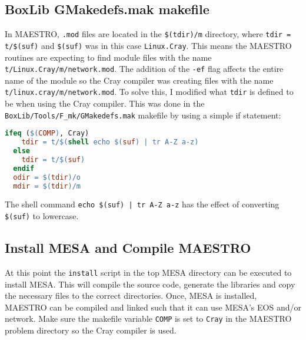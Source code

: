 \subsection{{\sf BoxLib GMakedefs.mak} makefile}

In {\sf MAESTRO}, {\tt .mod} files are located in the {\tt \$(tdir)/m} 
directory, where {\tt tdir = t/\$(suf)} and {\tt \$(suf)} was in this case 
{\tt Linux.Cray}. This means the {\sf MAESTRO} routines are expecting to find 
module files with the name {\tt t/Linux.Cray/m/network.mod}. The addition of 
the {\tt -ef} flag affects the entire name of the module so the Cray compiler 
was creating files with the name {\tt t/linux.cray/m/network.mod}. To solve 
this, I modified what {\tt tdir} is defined to be when using the Cray compiler. 
This was done in the {\tt BoxLib/Tools/F\_mk/GMakedefs.mak} makefile by using 
a simple if statement:
\begin{lstlisting}[language=make,mathescape=false]
  ifeq ($(COMP), Cray)
    tdir = t/$(shell echo $(suf) | tr A-Z a-z)
  else
    tdir = t/$(suf)
  endif
  odir = $(tdir)/o
  mdir = $(tdir)/m
\end{lstlisting}
The shell command {\tt echo \$(suf) | tr A-Z a-z} has the effect of converting 
{\tt \$(suf)} to lowercase.

\subsection{Install {\sf MESA} and Compile {\sf MAESTRO}}

At this point the {\tt install} script in the top {\sf MESA} directory can be 
executed to install {\sf MESA}. This will compile the source code, generate 
the libraries and copy the necessary files to the correct directories. Once, 
{\sf MESA} is installed, {\sf MAESTRO} can be compiled and linked such that 
it can use {\sf MESA}'s EOS and/or network. Make sure the makefile variable 
{\tt COMP} is set to {\tt Cray} in the {\sf MAESTRO} problem directory 
so the Cray compiler is used.


